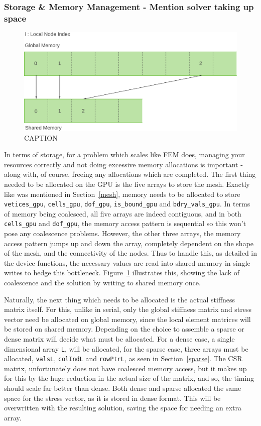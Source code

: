 \subsubsection{Storage \& Memory Management - Mention solver taking up space}

\begin{figure}
	\centering
	\includegraphics[width = 0.8\linewidth]{Figures/non_coalesced}
	\caption{CAPTION}
	\label{fig:coalesc}
\end{figure}
In terms of storage, for a problem which scales like FEM does, managing your resources correctly and not doing excessive memory allocations is important - along with, of course, freeing any allocations which are completed. The first thing needed to be allocated on the GPU is the five arrays to store the mesh. Exactly like was mentioned in Section~\ref{mesh}, memory needs to be allocated to store \texttt{vetices\_gpu}, \texttt{cells\_gpu}, \texttt{dof\_gpu}, \texttt{is\_bound\_gpu} and \texttt{bdry\_vals\_gpu}. In terms of memory being coalesced, all five arrays are indeed contiguous, and in both \texttt{cells\_gpu} and \texttt{dof\_gpu}, the memory access pattern is sequential so this won't pose any coalescence problems. However, the other three arrays, the memory access pattern jumps up and down the array, completely dependent on the shape of the mesh, and the connectivity of the nodes. Thus to handle this, as detailed in the device functions, the necessary values are read into shared memory in single writes to hedge this bottleneck. Figure~\ref{fig:coalesc} illustrates this, showing the lack of coalescence and the solution by writing to shared memory once.

Naturally, the next thing which needs to be allocated is the actual stiffness matrix itself. For this, unlike in serial, only the global stiffness matrix and stress vector need be allocated on global memory, since the local element matrices will be stored on shared memory. Depending on the choice to assemble a sparse or dense matrix will decide what must be allocated. For a dense case, a single dimensional array \texttt{L}, will be allocated, for the sparse case, three arrays must be allocated, \texttt{valsL}, \texttt{colIndL} and \texttt{rowPtrL}, as seen in Section~\ref{sparse}. The CSR matrix, unfortunately does not have coalesced memory access, but it makes up for this by the huge reduction in the actual size of the matrix, and so, the timing should scale far better than dense. Both dense and sparse allocated the same space for the stress vector, as it is stored in dense format. This will be overwritten with the resulting solution, saving the space for needing an extra array.

